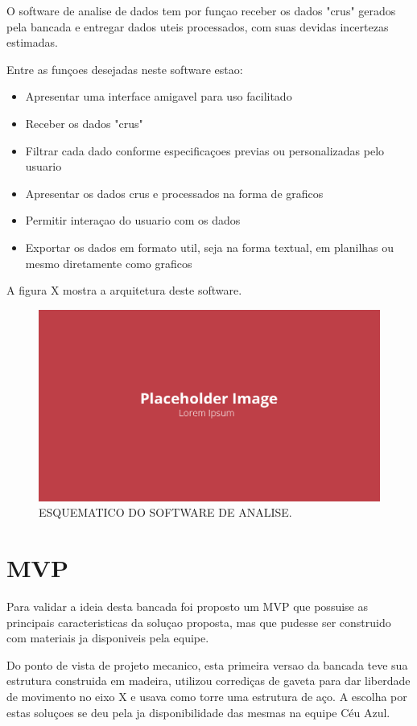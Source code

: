 O software de analise de dados tem por funçao receber os dados "crus" gerados pela bancada e entregar dados uteis processados, com suas devidas incertezas estimadas.

Entre as funçoes desejadas neste software estao:

\begin{itemize}
    \item Apresentar uma interface amigavel para uso facilitado
    \item Receber os dados "crus"
    \item Filtrar cada dado conforme especificaçoes previas ou personalizadas pelo usuario
    \item Apresentar os dados crus e processados na forma de graficos
    \item Permitir interaçao do usuario com os dados
    \item Exportar os dados em formato util, seja na forma textual, em planilhas ou mesmo diretamente como graficos
\end{itemize}

A figura X mostra a arquitetura deste software.

\begin{figure}[!ht]
    \centering
    \includegraphics[width=.8\linewidth]{figuras/placeholder.png}
    \caption{ESQUEMATICO DO SOFTWARE DE ANALISE\cite{autor}.}
    \label{fig:placeholder}
\end{figure}

\section{MVP}

Para validar a ideia desta bancada foi proposto um MVP que possuise as principais caracteristicas da soluçao proposta, mas que pudesse ser construido com materiais ja disponiveis pela equipe.

Do ponto de vista de projeto mecanico, esta primeira versao da bancada teve sua estrutura construida em madeira, utilizou corrediças de gaveta para dar liberdade de movimento no eixo X e usava como torre uma estrutura de aço. A escolha por estas soluçoes se deu pela ja disponibilidade das mesmas na equipe Céu Azul.

